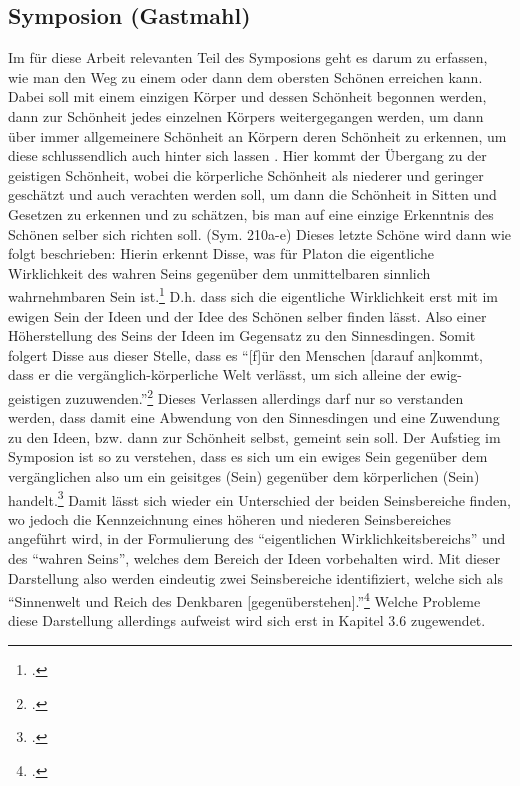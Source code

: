 \subsection{Symposion (Gastmahl)}
Im für diese Arbeit relevanten Teil des Symposions geht es darum zu erfassen, wie man den Weg zu einem oder dann dem obersten Schönen erreichen kann. Dabei soll mit einem einzigen Körper und dessen Schönheit begonnen werden, dann zur Schönheit jedes einzelnen Körpers weitergegangen werden, um dann über immer allgemeinere Schönheit an Körpern deren Schönheit zu erkennen, um diese schlussendlich auch hinter sich lassen . Hier kommt der Übergang zu der geistigen Schönheit, wobei die körperliche Schönheit als niederer und geringer geschätzt und auch verachten werden soll, um dann die Schönheit in Sitten und Gesetzen zu erkennen und zu schätzen, bis man auf eine einzige Erkenntnis des Schönen selber sich richten soll. (Sym. 210a-e)  
Dieses letzte Schöne wird dann wie folgt beschrieben: 
Hierin erkennt Disse, was für Platon die eigentliche Wirklichkeit des wahren Seins gegenüber dem unmittelbaren sinnlich wahrnehmbaren Sein ist.\footcite[vgl.][S. 27]{DisseMetaphysik} D.h. dass sich die eigentliche Wirklichkeit erst mit im ewigen Sein der Ideen und der Idee des Schönen selber finden lässt. Also einer Höherstellung des Seins der Ideen im Gegensatz zu den Sinnesdingen. Somit folgert Disse aus dieser Stelle, dass es \enquote{[f]ür den Menschen [darauf an]kommt, dass er die vergänglich-körperliche Welt verlässt, um sich alleine der ewig-geistigen zuzuwenden.}\footcite[vgl.][S. 28]{DisseMetaphysik} Dieses Verlassen allerdings darf nur so verstanden werden, dass damit eine Abwendung von den Sinnesdingen und eine Zuwendung zu den Ideen, bzw. dann zur Schönheit selbst, gemeint sein soll. 
Der Aufstieg im Symposion ist so zu verstehen, dass es sich um ein ewiges Sein gegenüber dem vergänglichen also um ein geisitges (Sein) gegenüber dem körperlichen (Sein) handelt.\footcite[vgl.][S. 27f.]{DisseMetaphysik}
Damit lässt sich wieder ein Unterschied der beiden Seinsbereiche finden, wo jedoch die Kennzeichnung eines höheren und niederen Seinsbereiches angeführt wird, in der Formulierung des \enquote{eigentlichen Wirklichkeitsbereichs} und des \enquote{wahren Seins}, welches dem Bereich der Ideen vorbehalten wird.
Mit dieser Darstellung also werden eindeutig zwei Seinsbereiche identifiziert, welche sich als \enquote{Sinnenwelt und Reich des Denkbaren [gegenüberstehen].}\footcite[vgl.][S. 28]{DisseMetaphysik} Welche Probleme diese Darstellung allerdings aufweist wird sich erst in Kapitel 3.6 zugewendet.
